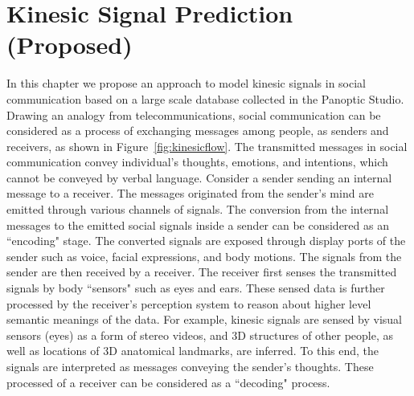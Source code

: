 
\chapter{Kinesic Signal Prediction \textbf{(Proposed)}}
\label{chapter:prediction}
In this chapter we propose an approach to model kinesic signals in social communication based on a large scale database collected in the Panoptic Studio. Drawing an analogy from telecommunications, social communication can be considered as a process of exchanging messages among people, as senders and receivers, as shown in Figure~\ref{fig:kinesicflow}. The transmitted messages in social communication convey individual's thoughts, emotions, and intentions, which cannot be conveyed by verbal language. Consider a sender sending an internal message to a receiver. The messages originated from the sender's mind are emitted through various channels of signals. The conversion from the internal messages to the emitted social signals inside a sender can be considered as an ``encoding" stage. The converted signals are exposed through display ports of the sender such as voice, facial expressions, and body motions. The signals from the sender are then received by a receiver. The receiver first senses the transmitted signals by body ``sensors" such as eyes and ears. These sensed data is further processed by the receiver's perception system to reason about higher level semantic meanings of the data. For example, kinesic signals are sensed by visual sensors (eyes) as a form of stereo videos, and 3D structures of other people, as well as locations of 3D anatomical landmarks, are inferred. To this end, the signals are interpreted as messages conveying the sender's thoughts.  These processed of a receiver can be considered as a ``decoding" process. 

